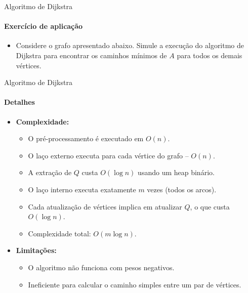 \begin{frame}{Algoritmo de Dijkstra}
\framesubtitle{Exercício de aplicação}

\begin{itemize}
	\item Considere o grafo apresentado abaixo. Simule a execução do algoritmo de Dijkstra para encontrar os caminhos mínimos de $A$ para todos os demais vértices.
\end{itemize}

\begin{figure}[width=0.5\textwidth]
\end{figure}
\end{frame}



\begin{frame}{Algoritmo de Dijkstra}
\framesubtitle{Detalhes}

\begin{itemize}
	\item \textbf{Complexidade:}
	\begin{itemize}
		\item O pré-processamento é executado em $O(n)$.
		\item O laço externo executa para cada vértice do grafo -- $O(n)$.
		\item A extração de $Q$ custa $O(\log n)$ usando um heap binário.
		\item O laço interno executa exatamente $m$ vezes (todos os arcos).
		\item Cada atualização de vértices implica em atualizar $Q$, o que custa $O(\log n)$.
		\item Complexidade total: $O(m \log n)$.
	\end{itemize}
	
	\medskip
	
	\item \textbf{Limitações:}
	\begin{itemize}
		\item O algoritmo não funciona com pesos negativos.
		\item Ineficiente para calcular o caminho simples entre um par de vértices.
	\end{itemize}
\end{itemize}
\end{frame}



